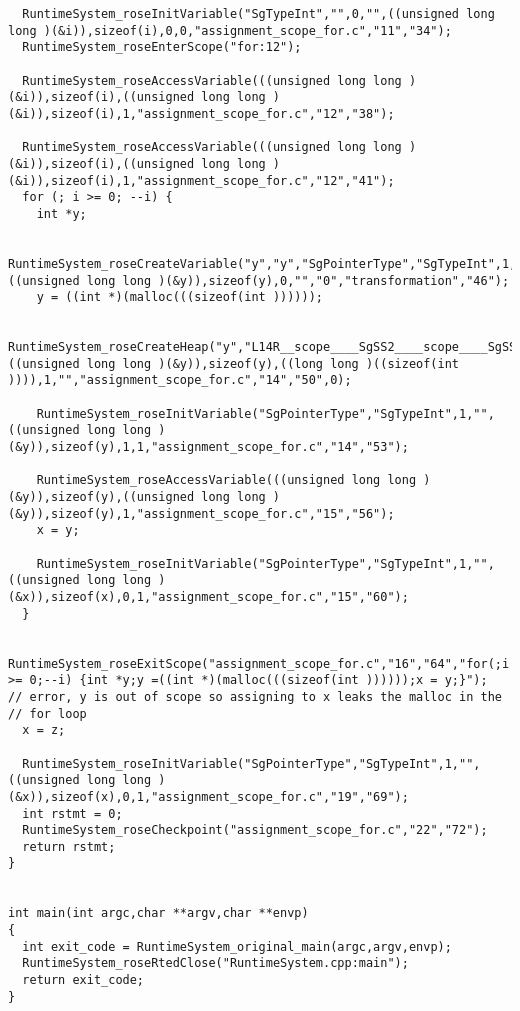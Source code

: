 \begin{verbatim}
  RuntimeSystem_roseInitVariable("SgTypeInt","",0,"",((unsigned long long )(&i)),sizeof(i),0,0,"assignment_scope_for.c","11","34");
  RuntimeSystem_roseEnterScope("for:12");
  
  RuntimeSystem_roseAccessVariable(((unsigned long long )(&i)),sizeof(i),((unsigned long long )(&i)),sizeof(i),1,"assignment_scope_for.c","12","38");
  
  RuntimeSystem_roseAccessVariable(((unsigned long long )(&i)),sizeof(i),((unsigned long long )(&i)),sizeof(i),1,"assignment_scope_for.c","12","41");
  for (; i >= 0; --i) {
    int *y;
    
    RuntimeSystem_roseCreateVariable("y","y","SgPointerType","SgTypeInt",1,((unsigned long long )(&y)),sizeof(y),0,"","0","transformation","46");
    y = ((int *)(malloc(((sizeof(int ))))));
    
    RuntimeSystem_roseCreateHeap("y","L14R__scope____SgSS2____scope____SgSS3____scope____SgSS4____scope__y","SgPointerType","SgTypeInt",1,((unsigned long long )(&y)),sizeof(y),((long long )((sizeof(int )))),1,"","assignment_scope_for.c","14","50",0);
    
    RuntimeSystem_roseInitVariable("SgPointerType","SgTypeInt",1,"",((unsigned long long )(&y)),sizeof(y),1,1,"assignment_scope_for.c","14","53");
    
    RuntimeSystem_roseAccessVariable(((unsigned long long )(&y)),sizeof(y),((unsigned long long )(&y)),sizeof(y),1,"assignment_scope_for.c","15","56");
    x = y;
    
    RuntimeSystem_roseInitVariable("SgPointerType","SgTypeInt",1,"",((unsigned long long )(&x)),sizeof(x),0,1,"assignment_scope_for.c","15","60");
  }
  
  RuntimeSystem_roseExitScope("assignment_scope_for.c","16","64","for(;i >= 0;--i) {int *y;y =((int *)(malloc(((sizeof(int ))))));x = y;}");
// error, y is out of scope so assigning to x leaks the malloc in the
// for loop
  x = z;
  
  RuntimeSystem_roseInitVariable("SgPointerType","SgTypeInt",1,"",((unsigned long long )(&x)),sizeof(x),0,1,"assignment_scope_for.c","19","69");
  int rstmt = 0;
  RuntimeSystem_roseCheckpoint("assignment_scope_for.c","22","72");
  return rstmt;
}


int main(int argc,char **argv,char **envp)
{
  int exit_code = RuntimeSystem_original_main(argc,argv,envp);
  RuntimeSystem_roseRtedClose("RuntimeSystem.cpp:main");
  return exit_code;
}
\end{verbatim}

